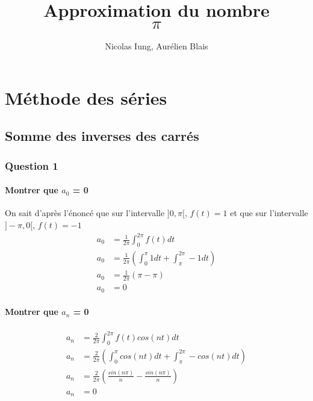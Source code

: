 \documentclass[a4paper,10pt]{report}
\title{Approximation du nombre $$\pi$$}
\author{Nicolas Iung, Aurélien Blais}
\begin{document}
\maketitle

\chapter{Méthode des séries}
\section{Somme des inverses des carrés}

\subsection{Question 1}
\subsubsection{Montrer que $a_0$ = 0}
On sait d'après l'énoncé que sur l'intervalle $]0, \pi[$, $f(t) = 1$ et que sur l'intervalle $]-\pi, 0[$, $f(t) = -1$\\

\begin{align*}
a_0 &= \frac{1}{2\pi} \int_{0}^{2\pi} f(t)dt \\
a_0 &= \frac{1}{2\pi} (\int_{0}^{\pi} 1 dt + \int_{\pi}^{2\pi} -1 dt)\\
a_0 &= \frac{1}{2\pi} (\pi - \pi)\\
a_0 &= 0
\end{align*}

\subsubsection{Montrer que $a_n$ = 0}
\begin{align*}
a_n &= \frac{2}{2\pi} \int_{0}^{2\pi} f(t)cos(nt) dt \\
a_n &= \frac{2}{2\pi} (\int_{0}^{\pi} cos(nt) dt + \int_{\pi}^{2\pi} -cos(nt) dt)\\
a_n &= \frac{2}{2\pi} (\frac{sin(n\pi)}{n} - \frac{sin(n\pi)}{n} )\\
a_n &= 0
\end{align*}
\end{document}
